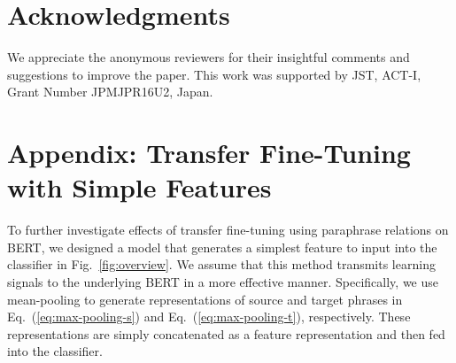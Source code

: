 \documentclass[11pt,a4paper]{article}
\newcommand{\Eref}[1]{Eq.~(\ref{#1})}
\newcommand{\Fref}[1]{Fig.~\ref{#1}}
\begin{document}
\section*{Acknowledgments}
We appreciate the anonymous reviewers for their insightful comments and suggestions to improve the paper. 
This work was supported by JST, ACT-I, Grant Number JPMJPR16U2, Japan.




\appendix
\section*{Appendix: Transfer Fine-Tuning with Simple Features}
\label{sec:appendix}
To further investigate effects of transfer fine-tuning using paraphrase relations on BERT, we designed a model that generates a simplest feature to input into the classifier in \Fref{fig:overview}.  
We assume that this method transmits learning signals to the underlying BERT in a more effective manner. 
Specifically, we use mean-pooling to generate representations of source and target phrases in \Eref{eq:max-pooling-s} and \Eref{eq:max-pooling-t}, respectively. 
These representations are simply concatenated as a feature representation and then fed into the classifier. 
\end{document}
